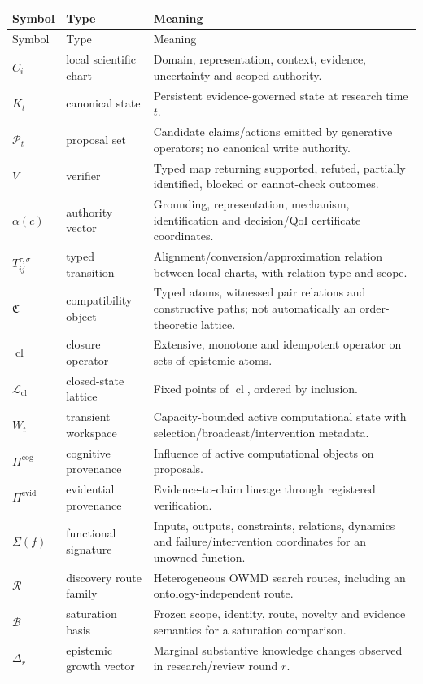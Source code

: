 \documentclass[11pt]{article}
\newcommand{\cl}{\operatorname{cl}}
\begin{document}
\begin{longtable}{>{\raggedright\arraybackslash}p{} >{\raggedright\arraybackslash}p{} >{\raggedright\arraybackslash}p{}}
\toprule
Symbol & Type & Meaning \\
\midrule
\endfirsthead
\toprule
Symbol & Type & Meaning \\
\midrule
\endhead
\(C_i\) & local scientific chart & Domain, representation, context, evidence, uncertainty and scoped authority. \\
\(K_t\) & canonical state & Persistent evidence-governed state at research time \(t\). \\
\(\mathcal P_t\) & proposal set & Candidate claims/actions emitted by generative operators; no canonical write authority. \\
\(V\) & verifier & Typed map returning supported, refuted, partially identified, blocked or cannot-check outcomes. \\
\(\alpha(c)\) & authority vector & Grounding, representation, mechanism, identification and decision/QoI certificate coordinates. \\
\(T_{ij}^{\tau,\sigma}\) & typed transition & Alignment/conversion/approximation relation between local charts, with relation type and scope. \\
\(\mathfrak C\) & compatibility object & Typed atoms, witnessed pair relations and constructive paths; not automatically an order-theoretic lattice. \\
\(\cl\) & closure operator & Extensive, monotone and idempotent operator on sets of epistemic atoms. \\
\(\mathcal L_{\cl}\) & closed-state lattice & Fixed points of \(\cl\), ordered by inclusion. \\
\(W_t\) & transient workspace & Capacity-bounded active computational state with selection/broadcast/intervention metadata. \\
\(\Pi^{\mathrm{cog}}\) & cognitive provenance & Influence of active computational objects on proposals. \\
\(\Pi^{\mathrm{evid}}\) & evidential provenance & Evidence-to-claim lineage through registered verification. \\
\(\Sigma(f)\) & functional signature & Inputs, outputs, constraints, relations, dynamics and failure/intervention coordinates for an unowned function. \\
\(\mathcal R\) & discovery route family & Heterogeneous OWMD search routes, including an ontology-independent route. \\
\(\mathcal B\) & saturation basis & Frozen scope, identity, route, novelty and evidence semantics for a saturation comparison. \\
\(\Delta_r\) & epistemic growth vector & Marginal substantive knowledge changes observed in research/review round \(r\). \\
\bottomrule
\end{longtable}
\end{document}
